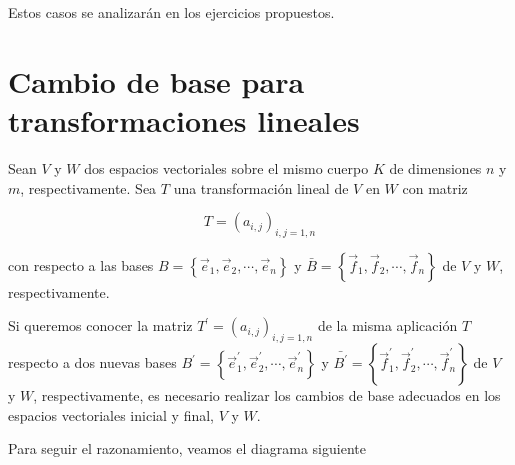 Estos casos se analizarán en los ejercicios propuestos.


\begin{figure}
    \centering
    \label{TLfig70}
\end{figure}


%

\section{Cambio  de base para transformaciones  lineales}
 \label{cbaseTL}

Sean $V$ y $W$ dos espacios vectoriales sobre el mismo cuerpo $K$ de dimensiones $n$ y $m$, respectivamente. Sea $T$ una transformación lineal de $V$ en $W$ con matriz 

$$T=(a_{i,j})_{i,j=1,n}$$

\bigskip

\noindent
con respecto a las bases $B= \left\{\vec{e}_1,\vec{e}_2,\cdots, \vec{e}_n\right\}$  y $\bar{B}= \left\{\vec{f}_1,\vec{f}_2,\cdots, \vec{f}_n\right\}$   de $V$ y $W$, respectivamente. 

\bigskip


Si queremos conocer la matriz $T^{\prime} =(a_{i,j})_{i,j=1,n}$ de la misma aplicación $T$ respecto a dos nuevas bases  $B^{\prime}= \left\{\vec{e}^{\prime}_1,\vec{e}^{\prime}_2,\cdots, \vec{e}^{\prime}_n\right\}$  y $\bar{B^{\prime}}= \left\{\vec{f}^{\prime}_1,\vec{f}^{\prime}_2,\cdots, \vec{f}^{\prime}_n\right\}$   de $V$ y $W$, respectivamente, es necesario realizar los cambios de base adecuados en los espacios vectoriales  inicial y final, $V$ y $W$.



\bigskip


\noindent
Para seguir el razonamiento, veamos el diagrama siguiente

%

